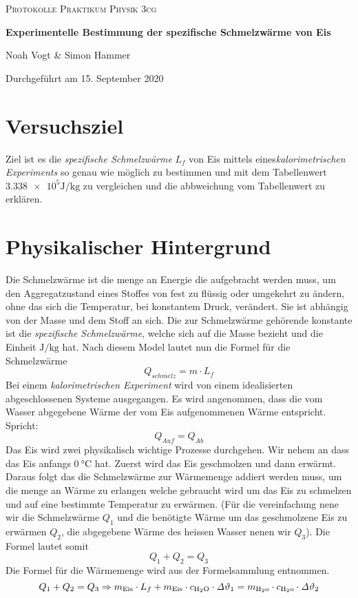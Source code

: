 \documentclass[a4 paper, 11pt]{article}
\begin{document}
\begin{titlepage}

\vspace*{1cm}
	\centering
	
	{\scshape\Large Protokolle Praktikum Physik 3cg \par}
	\vspace{0.5cm}
	{\huge\bfseries Experimentelle Bestimmung der spezifische Schmelzwärme von Eis\par}
	\vspace{0.5cm}
	{\Large Noah Vogt \& Simon Hammer\par}
	\vspace{0.5cm}

	{\large Durchgeführt am 15. September 2020\par}
	
\end{titlepage}

\tableofcontents
\pagebreak

\section{Versuchsziel}
Ziel ist es die \textit{spezifische Schmelzwärme} $L_f$ von Eis mittels eines\textit{kalorimetrischen Experiments} so genau wie möglich zu bestimmen und mit dem Tabellenwert $ \num{3.338 e5}\si{\J\per\kg} $ zu vergleichen und die abbweichung vom Tabellenwert zu erklären.

\section{Physikalischer Hintergrund}
Die Schmelzwärme ist die menge an Energie die aufgebracht werden muss, um den Aggregatzustand eines Stoffes von fest zu flüssig oder umgekehrt zu ändern, ohne das sich die Temperatur, bei konstantem Druck, verändert. Sie ist abhängig von der Masse und dem Stoff an sich. Die zur Schmelzwärme gehörende konstante ist die \textit{spezifische Schmelzwärme}, welche sich auf die Masse bezieht und die Einheit $\si{\J\per\kg}$ hat. Nach diesem Model lautet nun die Formel für die Schmelzwärme 
$$ Q_{schmelz}= m \cdot L_f$$
Bei einem \textit{kalorimetrischen Experiment} wird von einem idealisierten abgeschlossenen Systeme ausgegangen. Es wird angenommen, dass die vom Wasser abgegebene Wärme der vom Eis aufgenommenen Wärme entspricht. Spricht:
$$ Q_{Auf}=Q_{Ab}$$
Das Eis wird zwei physikalisch wichtige Prozesse durchgehen. Wir nehem an dass das Eis anfangs $\SI{0}{\celsius}$ hat. Zuerst wird das Eis geschmolzen und dann erwärmt. Daraus folgt das die Schmelzwärme zur Wärmemenge addiert werden muss, um die menge an Wärme zu erlangen welche gebraucht wird um das Eis zu schmelzen und auf eine bestimmte Temperatur zu erwärmen. (Für die vereinfachung nene wir die Schmelzwärme $Q_{1}$ und die benötigte Wärme um das geschmolzene Eis zu erwärmen $Q_{2}$, die abgegebene Wärme des heissen Wasser nenen wir $Q_{3}$). Die Formel lautet somit
$$ Q_{1} + Q_{2} = Q_{3} $$
Die Formel für die Wärmemenge wird aus der Formelsammlung entnommen.
$$ Q_{1} + Q_{2} = Q_{3} \Rightarrow m_{\rm{Eis}} \cdot L_f + m_{\rm{Eis}} \cdot c_{\rm{H_2O}} \cdot \mathit{\Delta}\vartheta_1 = m_{\rm{H_2o}} \cdot c_{\rm{H_2o}} \cdot \mathit{\Delta}\vartheta_2$$
\end{document}
